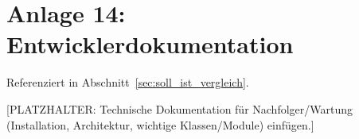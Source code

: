 \section*{Anlage 14: Entwicklerdokumentation}
\label{anh:entwicklerdokumentation}
Referenziert in Abschnitt~\ref{sec:soll_ist_vergleich}.

[PLATZHALTER: Technische Dokumentation f\"ur Nachfolger/Wartung
(Installation, Architektur, wichtige Klassen/Module) einf\"ugen.]
